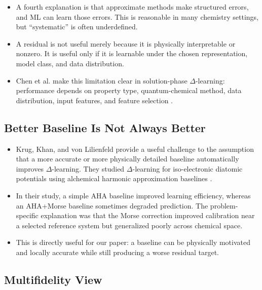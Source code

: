 \documentclass[11pt]{article}
\begin{document}
\begin{itemize}
  \item A fourth explanation is that approximate methods make structured errors, and ML can learn those errors. This is reasonable in many chemistry settings, but ``systematic'' is often underdefined.

  \item A residual is not useful merely because it is physically interpretable or nonzero. It is useful only if it is learnable under the chosen representation, model class, and data distribution.

  \item Chen et al. make this limitation clear in solution-phase \(\Delta\)-learning: performance depends on property type, quantum-chemical method, data distribution, input features, and feature selection \cite{chen2023solutiondelta}.
\end{itemize}

\subsection*{Better Baseline Is Not Always Better}

\begin{itemize}
  \item Krug, Khan, and von Lilienfeld provide a useful challenge to the assumption that a more accurate or more physically detailed baseline automatically improves \(\Delta\)-learning. They studied \(\Delta\)-learning for iso-electronic diatomic potentials using alchemical harmonic approximation baselines \cite{krug2025aha}.

  \item In their study, a simple AHA baseline improved learning efficiency, whereas an AHA+Morse baseline sometimes degraded prediction. The problem-specific explanation was that the Morse correction improved calibration near a selected reference system but generalized poorly across chemical space.

  \item This is directly useful for our paper: a baseline can be physically motivated and locally accurate while still producing a worse residual target.
\end{itemize}

\subsection*{Multifidelity View}
\end{document}
